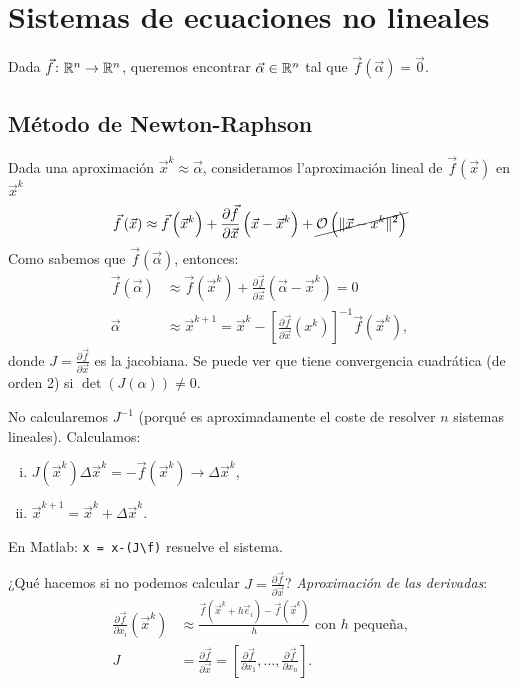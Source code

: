 \chapter{Sistemas de ecuaciones no lineales}

\noindent Dada $\vec{f} \colon \mathbb{R}^n \to \mathbb{R}^n$, queremos encontrar $\vec{\alpha} \in \mathbb{R}^n$ tal que $\vec{f}\left( \vec{\alpha} \right) = \vec{0}$.

\section{M\'etodo de Newton-Raphson}

\noindent Dada una aproximaci\'on $\vec{x}^k \approx \vec{\alpha}$, consideramos l'aproximaci\'on lineal de $\vec{f}\left( \vec{x} \right)$ en $\vec{x}^k$
\[
    \vec{f}\left( \vec{x} \right) \approx \vec{f}\left( \vec{x}^k \right) + \frac{\partial \vec{f}}{\partial \vec{x}}\left( \vec{x}-\vec{x}^k \right) + \cancel{\mathcal{O} \left( \| \vec{x}-x^k\|^2 \right)}
\]
Como sabemos que $\vec{f} \left( \vec{\alpha} \right)$, entonces:
\begin{align*}
    \vec{f}\left( \vec{\alpha} \right) &\approx \vec{f}\left( \vec{x}^k \right) + \frac{\partial \vec{f}}{\partial \vec{x}}\left( \vec{\alpha}-\vec{x}^k \right) = 0\\
    \vec{\alpha} &\approx \vec{x}^{k+1} = \vec{x}^k - \left[ \frac{\partial\vec{f}}{\partial\vec{x}}\left( x^k \right) \right]^{-1} \vec{f}\left( \vec{x}^k \right),
\end{align*}
donde $J = \frac{\partial\vec{f}}{\partial \vec{x}}$ es la jacobiana. Se puede ver que tiene convergencia cuadr\'atica (de orden 2) si $\det\left( J(\alpha) \right) \neq 0$.

\begin{obs}
    No calcularemos $J^{-1}$ (porqu\'e es aproximadamente el coste de resolver $n$ sistemas lineales). Calculamos:
    \begin{enumerate}[i)]
        \item $J\left( \vec{x}^k \right)\Delta \vec{x}^k = -\vec{f}\left( \vec{x}^k \right) \longrightarrow \Delta \vec{x}^k$,
        \item $\vec{x}^{k+1} = \vec{x}^k + \Delta\vec{x}^k$.
    \end{enumerate}
    En Matlab: \texttt{x = x-(J\textbackslash f)} resuelve el sistema.
\end{obs}

\noindent ¿Qu\'e hacemos si no podemos calcular $J = \frac{\partial \vec{f}}{\partial \vec{x}}$?
\emph{Aproximaci\'on de las derivadas}:
\begin{align*}
    \frac{\partial \vec{f}}{\partial x_i}\left( \vec{x}^k \right) &\approx \frac{\vec{f}\left( \vec{x}^k + h\vec{e}_i \right) - \vec{f}\left( \vec{x}^k \right)}{h} \text{ con } h \text{ pequeña,} \\
    J &= \frac{\partial \vec{f}}{\partial \vec{x}} = \left[ \frac{\partial \vec{f}}{\partial x_1}, \dots, \frac{\partial \vec{f}}{\partial x_n} \right].
\end{align*}

